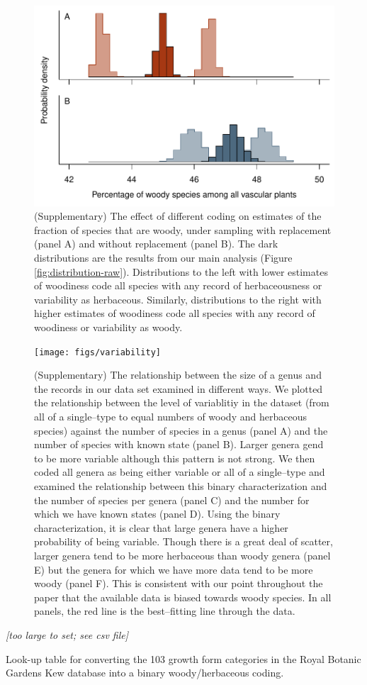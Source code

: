 \documentclass[a4paper,12pt]{article}
\begin{document}
\begin{figure}[p]
  \centering
  \includegraphics{figs/distribution-raw-errors}
  \caption{(Supplementary) The effect of different coding on estimates
    of the fraction of species that are woody, under sampling with
    replacement (panel A) and without replacement (panel B).  The dark
    distributions are the results from our main analysis (Figure
    \ref{fig:distribution-raw}).  Distributions to the left with lower
    estimates of woodiness code all species with any record of
    herbaceousness or variability as herbaceous.  Similarly,
    distributions to the right with higher estimates of woodiness code
    all species with any record of woodiness or variability as woody.}
  \label{fig:distribution-raw-errors}
\end{figure}

\begin{figure}[p]
  \centering
  \texttt{[image: figs/variability]}
  \caption{(Supplementary) The relationship between the size of a genus
and the records in our data set examined in different ways. We plotted 
the relationship between the level of variablitiy in the dataset (from all
of a single--type to equal numbers of woody and herbaceous species) against
the number of species in a genus (panel A) and the number of species with known
state (panel B). Larger genera gend to be more variable although this pattern
is not strong. We then coded all genera as being either variable or all of a single--type
and examined the relationship between this binary characterization and the number
of species per genera (panel C) and the number for which we have known states (panel D). Using 
the binary characterization, it is clear that large genera have a higher probability
of being variable. Though there is a great deal of scatter, larger genera tend to be more herbaceous
than woody genera (panel E) but the genera for which we have more data tend to be more
woody (panel F). This is consistent with our point throughout the paper that the available
data is biased towards woody species.
In all panels, the red line is the best--fitting line through the data.  
}
  \label{fig:size-woody-herb}
\end{figure}

\begin{table}[p]
  \centering
  \textit{[too large to set; see csv file]}
  \caption{Look-up table for converting the 103 growth form categories
    in the Royal Botanic Gardens Kew database into a binary
woody/herbaceous coding.}
\label{tab:kew}
\end{table}
\end{document}
